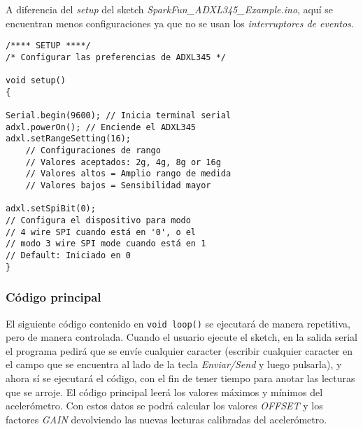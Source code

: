 \documentclass[10pt, a4paper, twocolumn]{article} %
\begin{document}
A diferencia del \textit{setup} del sketch \textit{SparkFun\_ADXL345\_Example.ino}, aquí se encuentran menos configuraciones ya que no se usan los \textit{interruptores de eventos}.

\begin{verbatim}
/**** SETUP ****/
/* Configurar las preferencias de ADXL345 */

void setup()
{

Serial.begin(9600); // Inicia terminal serial
adxl.powerOn(); // Enciende el ADXL345
adxl.setRangeSetting(16);           
    // Configuraciones de rango
    // Valores aceptados: 2g, 4g, 8g or 16g
    // Valores altos = Amplio rango de medida
    // Valores bajos = Sensibilidad mayor
                                      
adxl.setSpiBit(0);                  
// Configura el dispositivo para modo 
// 4 wire SPI cuando está en '0', o el
// modo 3 wire SPI mode cuando está en 1                                    
// Default: Iniciado en 0
}

\end{verbatim}


\subsubsection{Código principal}

El siguiente código contenido en \texttt{void loop()} se ejecutará de manera repetitiva, pero de manera controlada. Cuando el usuario ejecute el sketch, en la salida serial el programa pedirá que se envíe cualquier caracter (escribir cualquier caracter en el campo que se encuentra al lado de la tecla \textit{Enviar/Send} y luego pulsarla), y ahora sí se ejecutará el código, con el fin de tener tiempo para anotar las lecturas que se arroje.
El código principal leerá los valores máximos y mínimos del acelerómetro. Con estos datos se podrá calcular los valores \textit{OFFSET} y los factores \textit{GAIN} devolviendo las nuevas lecturas calibradas del acelerómetro.
\end{document}
